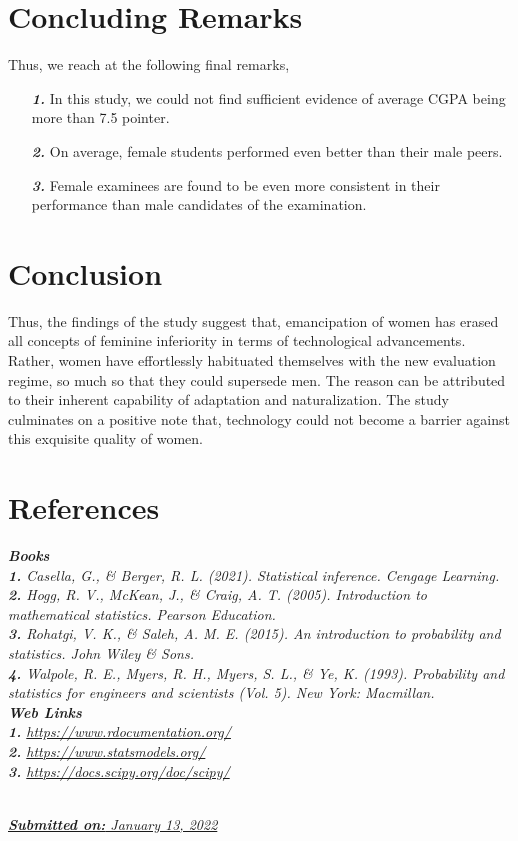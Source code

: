 \documentclass[12pt,a4paper]{report}
\begin{document}
\section{Concluding Remarks}
\Large{Thus, we reach at the following final remarks,}
\begin{enumerate}
    \item [\textit{\textbf{1.}}]
    \Large{In this study, we could not find sufficient evidence of average CGPA being more than 7.5 pointer.}
     \item [\textit{\textbf{2.}}]
    \Large{On average, female students performed even better than their male peers.}
    \item [\textit{\textbf{3.}}]
    \Large{Female examinees are found to be even more consistent in their performance than male candidates of the examination.}
\end{enumerate}
\pagebreak
\section{Conclusion}
\Large{Thus, the findings of the study suggest that, emancipation of women has erased all concepts of feminine inferiority in terms of technological advancements. Rather, women have effortlessly habituated themselves with the new evaluation regime, so much so that they could supersede men. The reason can be attributed to their inherent capability of adaptation and naturalization. The study culminates on a positive note that, technology could not become a barrier against this exquisite quality of women.}
\section{References}
\textbf{\textit{\Large{Books}}}\\
\large{\textit{\textbf{1.} Casella, G., \& Berger, R. L. (2021). Statistical inference. Cengage Learning.}}\\[5pt]
\large{\textit{\textbf{2.} Hogg, R. V., McKean, J., \& Craig, A. T. (2005). Introduction to mathematical statistics. Pearson Education.}}\\[5pt]
\large{\textit{\textbf{3.} Rohatgi, V. K., \& Saleh, A. M. E. (2015). An introduction to probability and statistics. John Wiley \& Sons.}}\\[5pt]
\large{\textit{\textbf{4.} Walpole, R. E., Myers, R. H., Myers, S. L., \& Ye, K. (1993). Probability and statistics for engineers and scientists (Vol. 5). New York: Macmillan.}}\\[10pt]
\textbf{\textit{\Large{Web Links}}}\\
\large{\textit{\textbf{1.} \url{https://www.rdocumentation.org/}}}\\[5pt]
\large{\textit{\textbf{2.} \url{https://www.statsmodels.org/}}}\\[5pt]
\large{\textit{\textbf{3.} \url{https://docs.scipy.org/doc/scipy/}}}
\pagebreak
\begin{center}
\textit{\vspace{7cm}\\\Large{\underline{\textbf{Submitted on:} January 13, 2022}}}
\end{center}
\pagebreak
\end{document}
